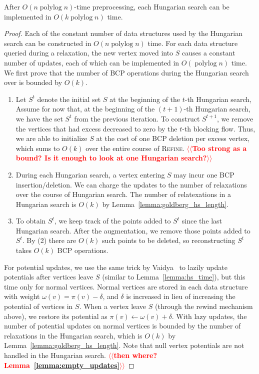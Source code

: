 \documentclass[a4paper,UKenglish]{socg-lipics-v2018}
\makeatletter
\def\note#1{\textcolor{red}{{#1}}}
\def\polylog{\mathop{\mathrm{polylog}}}
\def\fsupply{\phi}
\theoremstyle{plain}
\numberwithin{figure}{section}
\def\n@te#1{\textsf{\boldmath \textbf{$\langle\!\langle$#1$\rangle\!\rangle$}}\leavevmode}
\def\note#1{\textcolor{red}{\n@te{#1}}}
\makeatother
\begin{document}
\begin{toappendix}

\begin{lemmarep}
\label{lemma:goldberg_hs_time}
After $O(n \polylog n)$-time preprocessing,
each Hungarian search can be implemented in $O(k \polylog n)$ time.
\end{lemmarep}
%
\begin{proof}
Each of the constant number of data structures used by the Hungarian search can be constructed in $O(n\polylog n)$ time.
For each data structure queried during a relaxation,
the new vertex moved into $S$ causes a constant number of updates, each of which can be implemented in $O(\polylog n)$ time.
%
We first prove that the number of BCP
operations during the Hungarian search over %
is bounded by $O(k)$.

\begin{enumerate}
\item Let $S^t$ denote the initial set $S$ at the beginning of the $t$-th Hungarian search,
Assume for now that, at the beginning of the $(t+1)$-th Hungarian search, we have the set $S^t$ from the previous iteration.
To construct $S^{t+1}$, we remove the vertices that had excess decreased to zero by the $t$-th blocking flow.
Thus, we are able to initialize $S$ at the cost of one BCP deletion per excess vertex, which sums to $O(k)$ over the entire course of \textsc{Refine}.  \note{Too strong as a bound? Is it enough to look at one Hungarian search?}

\item During each Hungarian search, a vertex entering $S$ may incur one BCP insertion/deletion.
We can charge the updates to the number of relaxations over the course of Hungarian search.
The number of relatexations in a Hungarian search is $O(k)$ by Lemma~\ref{lemma:goldberg_hs_length}.

\item To obtain $S^t$, we keep track of the points added to $S^t$ since the last Hungarian search.  After the augmentation, we remove those points added to $S^t$.  By (2) there are $O(k)$ such points to be deleted, so reconstructing $S^t$ takes $O(k)$ BCP operations.
\end{enumerate}

For potential updates, we use the same trick by Vaidya~\cite{Vaidya89} to
lazily update potentials after vertices leave $S$ (similar to Lemma~\ref{lemma:hs_time}), but this time only for normal vertices.
Normal vertices are stored in each data structure with weight
$\omega(v) = \pi(v) - \delta$, and $\delta$ is increased in lieu of increasing
the potential of vertices in $S$.
When a vertex leave $S$ (through the rewind mechanism above), we restore
its potential as $\pi(v) \gets \omega(v) + \delta$.
With lazy updates, the number of potential updates on normal vertices is
bounded by the number of relaxations in the Hungarian search, which is $O(k)$ by Lemma~\ref{lemma:goldberg_hs_length}.
Note that null vertex potentials are not handled in the Hungarian search. \note{then where? Lemma~\ref{lemma:empty_updates}}
\end{proof}



\end{toappendix}
\end{document}
